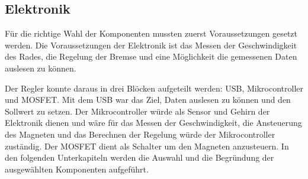 \subsection{Elektronik} \label{cap:material_electronics}
Für die richtige Wahl der Komponenten mussten zuerst Voraussetzungen gesetzt werden. Die Voraussetzungen der Elektronik ist das Messen der Geschwindigkeit des Rades, die Regelung der Bremse und eine Möglichkeit die gemessenen Daten auslesen zu können. 



Der Regler konnte daraus in drei Blöcken aufgeteilt werden: USB, Mikrocontroller und MOSFET. Mit dem USB war das Ziel, Daten auslesen zu können und den Sollwert zu setzen. Der Mikrocontroller würde als Sensor und Gehirn der Elektronik dienen und wäre für das Messen der Geschwindigkeit, die Ansteuerung des Magneten und das Berechnen der Regelung würde der Mikrocontroller zuständig. Der MOSFET dient als Schalter um den Magneten anzusteuern.
\newpara
In den folgenden Unterkapiteln werden die Auswahl und die Begründung der ausgewählten Komponenten aufgeführt.

